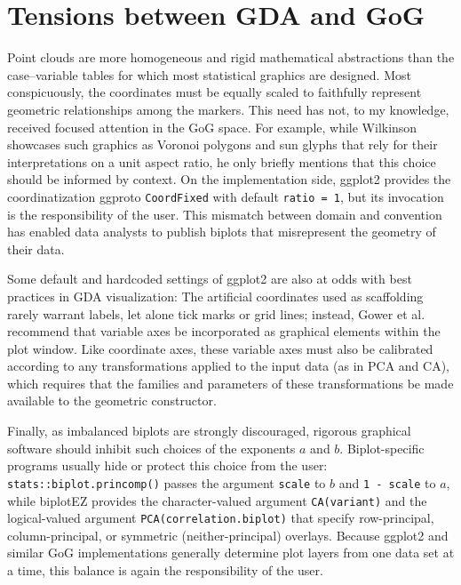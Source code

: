 \documentclass{vgtc}                          %
\newcommand{\pkg}[1]{\textsf{#1}}
\begin{document}
\section{Tensions between GDA and GoG}

Point clouds are more homogeneous and rigid mathematical abstractions than the case--variable tables for which most statistical graphics are designed.
Most conspicuously, the coordinates must be equally scaled to faithfully represent geometric relationships among the markers.
This need has not, to my knowledge, received focused attention in the GoG space.
For example, while Wilkinson showcases such graphics as Voronoi polygons and sun glyphs that rely for their interpretations on a unit aspect ratio, he only briefly mentions that this choice should be informed by context.
On the implementation side, \pkg{ggplot2} provides the coordinatization ggproto \texttt{CoordFixed} with default \texttt{ratio = 1}, but its invocation is the responsibility of the user.
This mismatch between domain and convention has enabled data analysts to publish biplots that misrepresent the geometry of their data.

Some default and hardcoded settings of \pkg{ggplot2} are also at odds with best practices in GDA visualization:
The artificial coordinates used as scaffolding rarely warrant labels, let alone tick marks or grid lines; instead, Gower et al. \cite{Gower2011} recommend that variable axes be incorporated as graphical elements within the plot window.
Like coordinate axes, these variable axes must also be calibrated according to any transformations applied to the input data (as in PCA and CA), which requires that the families and parameters of these transformations be made available to the geometric constructor.

Finally, as imbalanced biplots are strongly discouraged, rigorous graphical software should inhibit such choices of the exponents $a$ and $b$.
Biplot-specific programs usually hide or protect this choice from the user:
\texttt{stats::biplot.princomp()} passes the argument \texttt{scale} to $b$ and \texttt{1 - scale} to $a$, while
\pkg{biplotEZ} provides the character-valued argument \texttt{CA(variant)} and the logical-valued argument \texttt{PCA(correlation.biplot)} that specify row-principal, column-principal, or symmetric (neither-principal) overlays.
Because \pkg{ggplot2} and similar GoG implementations generally determine plot layers from one data set at a time, this balance is again the responsibility of the user.
\end{document}
